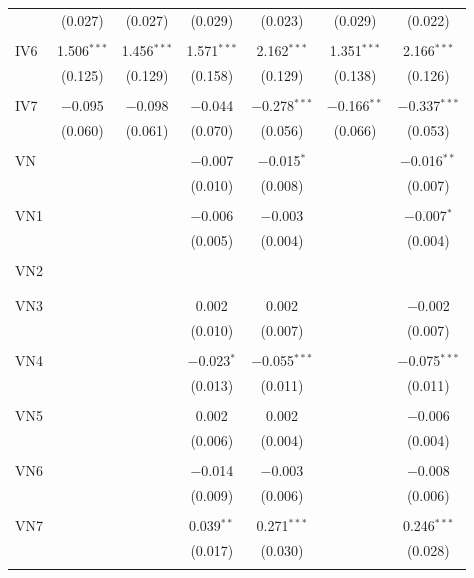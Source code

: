 \begin{table}[!htbp]
\begin{tabular}{@{\extracolsep{5pt}}lcccccc}
  & (0.027) & (0.027) & (0.029) & (0.023) & (0.029) & (0.022) \\ 
  & & & & & & \\ 
 IV6 & 1.506$^{***}$ & 1.456$^{***}$ & 1.571$^{***}$ & 2.162$^{***}$ & 1.351$^{***}$ & 2.166$^{***}$ \\ 
  & (0.125) & (0.129) & (0.158) & (0.129) & (0.138) & (0.126) \\ 
  & & & & & & \\ 
 IV7 & $-$0.095 & $-$0.098 & $-$0.044 & $-$0.278$^{***}$ & $-$0.166$^{**}$ & $-$0.337$^{***}$ \\ 
  & (0.060) & (0.061) & (0.070) & (0.056) & (0.066) & (0.053) \\ 
  & & & & & & \\ 
 VN &  &  & $-$0.007 & $-$0.015$^{*}$ &  & $-$0.016$^{**}$ \\ 
  &  &  & (0.010) & (0.008) &  & (0.007) \\ 
  & & & & & & \\ 
 VN1 &  &  & $-$0.006 & $-$0.003 &  & $-$0.007$^{*}$ \\ 
  &  &  & (0.005) & (0.004) &  & (0.004) \\ 
  & & & & & & \\ 
 VN2 &  &  &  &  &  &  \\ 
  &  &  &  &  &  &  \\ 
  & & & & & & \\ 
 VN3 &  &  & 0.002 & 0.002 &  & $-$0.002 \\ 
  &  &  & (0.010) & (0.007) &  & (0.007) \\ 
  & & & & & & \\ 
 VN4 &  &  & $-$0.023$^{*}$ & $-$0.055$^{***}$ &  & $-$0.075$^{***}$ \\ 
  &  &  & (0.013) & (0.011) &  & (0.011) \\ 
  & & & & & & \\ 
 VN5 &  &  & 0.002 & 0.002 &  & $-$0.006 \\ 
  &  &  & (0.006) & (0.004) &  & (0.004) \\ 
  & & & & & & \\ 
 VN6 &  &  & $-$0.014 & $-$0.003 &  & $-$0.008 \\ 
  &  &  & (0.009) & (0.006) &  & (0.006) \\ 
  & & & & & & \\ 
 VN7 &  &  & 0.039$^{**}$ & 0.271$^{***}$ &  & 0.246$^{***}$ \\ 
  &  &  & (0.017) & (0.030) &  & (0.028) \\ 
  & & & & & & \\ 

\end{tabular}
\end{table}
